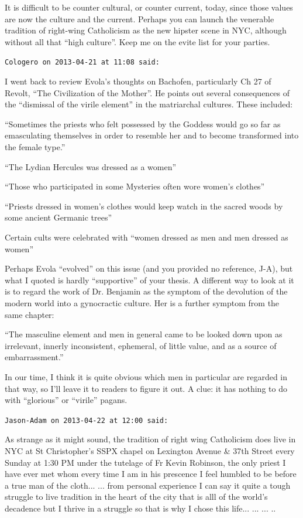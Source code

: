 \begin{footnotesize}
\begin{sffamily}
It is difficult to be counter cultural, or counter current, today, since those values are now the culture and the current. Perhaps you can launch the venerable tradition of right-wing Catholicism as the new hipster scene in NYC, although without all that ``high culture''. Keep me on the evite list for your parties.

\hfill

\texttt{Cologero on 2013-04-21 at 11:08 said:}

I went back to review Evola's thoughts on Bachofen, particularly Ch 27 of Revolt, ``The Civilization of the Mother''. He points out several consequences of the ``dismissal of the virile element'' in the matriarchal cultures. These included:

``Sometimes the priests who felt possessed by the Goddess would go so far as emasculating themselves in order to resemble her and to become transformed into the female type.''

``The Lydian Hercules was dressed as a women''

``Those who participated in some Mysteries often wore women's clothes''

``Priests dressed in women's clothes would keep watch in the sacred woods by some ancient Germanic trees''

Certain cults were celebrated with ``women dressed as men and men dressed as women''

Perhaps Evola ``evolved'' on this issue (and you provided no reference, J-A), but what I quoted is hardly ``supportive'' of your thesis. A different way to look at it is to regard the work of Dr. Benjamin as the symptom of the devolution of the modern world into a gynocractic culture. Her is a further symptom from the same chapter:

``The masculine element and men in general came to be looked down upon as irrelevant, innerly inconsistent, ephemeral, of little value, and as a source of embarrassment.''

In our time, I think it is quite obvious which men in particular are regarded in that way, so I'll leave it to readers to figure it out. A clue: it has nothing to do with ``glorious'' or ``virile'' pagans.

\hfill

\texttt{Jason-Adam on 2013-04-22 at 12:00 said:}

As strange as it might sound, the tradition of right wing Catholicism does live in NYC at St Christopher's SSPX chapel on Lexington Avenue \& 37th Street every Sunday at 1:30 PM under the tutelage of Fr Kevin Robinson, the only priest I have ever met whom every time I am in his prescence I feel humbled to be before a true man of the cloth... ... from personal experience I can say it quite a tough struggle to live tradition in the heart of the city that is alll of the world's decadence but I thrive in a struggle so that is why I chose this life... ... ... ..


\end{sffamily}
\end{footnotesize}
